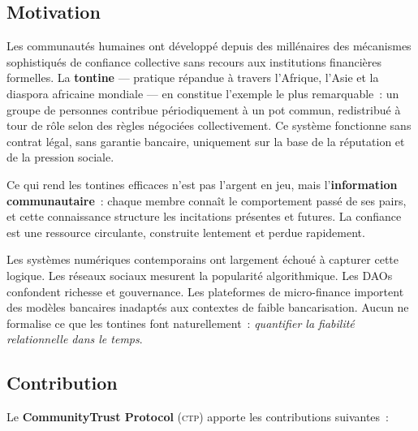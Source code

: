 \documentclass[12pt,a4paper]{article}
\theoremstyle{definition}
\theoremstyle{plain}
\theoremstyle{remark}
\newcommand{\CTP}{\textsc{ctp}}
\newcommand{\1}{\mathbf{1}}
\begin{document}
\subsection{Motivation}

Les communautés humaines ont développé depuis des millénaires des mécanismes
sophistiqués de confiance collective sans recours aux institutions financières
formelles. La \textbf{tontine} --- pratique répandue à travers l'Afrique,
l'Asie et la diaspora africaine mondiale --- en constitue l'exemple le plus
remarquable~: un groupe de personnes contribue périodiquement à un pot commun,
redistribué à tour de rôle selon des règles négociées collectivement. Ce
système fonctionne sans contrat légal, sans garantie bancaire, uniquement sur
la base de la réputation et de la pression sociale.

Ce qui rend les tontines efficaces n'est pas l'argent en jeu, mais
l'\textbf{information communautaire}~: chaque membre connaît le comportement
passé de ses pairs, et cette connaissance structure les incitations présentes
et futures. La confiance est une ressource circulante, construite lentement et
perdue rapidement.

Les systèmes numériques contemporains ont largement échoué à capturer cette
logique. Les réseaux sociaux mesurent la popularité algorithmique. Les DAOs
confondent richesse et gouvernance. Les plateformes de micro-finance importent
des modèles bancaires inadaptés aux contextes de faible bancarisation. Aucun
ne formalise ce que les tontines font naturellement~: \emph{quantifier la
fiabilité relationnelle dans le temps}.

\subsection{Contribution}

Le \textbf{CommunityTrust Protocol} (\CTP{}) apporte les contributions
suivantes~:
\end{document}
